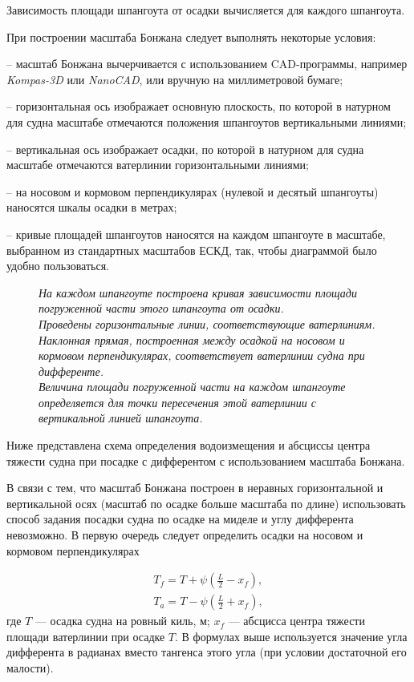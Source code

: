 Зависимость площади шпангоута от осадки вычисляется для каждого шпангоута.

При построении масштаба Бонжана следует выполнять некоторые условия:

-- масштаб Бонжана вычерчивается с использованием CAD-программы, например \textit{Kompas-3D} или \textit{NanoCAD}, или вручную на миллиметровой бумаге;

-- горизонтальная ось изображает основную плоскость, по которой в натурном для судна масштабе отмечаются положения шпангоутов вертикальными линиями;

-- вертикальная ось изображает осадки, по которой в натурном для судна масштабе отмечаются ватерлинии горизонтальными линиями;

-- на носовом и кормовом перпендикулярах (нулевой и десятый шпангоуты) наносятся шкалы осадки в метрах;

-- кривые площадей шпангоутов наносятся на каждом шпангоуте в масштабе, выбранном из стандартных масштабов ЕСКД, так, чтобы диаграммой было удобно пользоваться.

\begin{figure}[h!]
    \centerline{}
    \caption{Пример масштаба Бонжана}
    \caption*{\textit{
        На каждом шпангоуте построена кривая зависимости площади погруженной части этого шпангоута от осадки. \\
        Проведены горизонтальные линии, соответствующие ватерлиниям.\\
        Наклонная прямая, построенная между осадкой на носовом и кормовом перпендикулярах, соответствует ватерлинии судна при дифференте. \\
        Величина площади погруженной части на каждом шпангоуте определяется для точки пересечения этой ватерлинии с вертикальной линией шпангоута.
    }}
    \label{fig:bonjean-diagram}
\end{figure}


Ниже представлена схема определения водоизмещения и абсциссы центра тяжести судна при посадке с дифферентом с использованием масштаба Бонжана.

В связи с тем, что масштаб Бонжана построен в неравных горизонтальной и вертикальной осях (масштаб по осадке больше масштаба по длине) использовать способ задания посадки судна по осадке на миделе и углу дифферента невозможно.
В первую очередь следует определить осадки на носовом и кормовом перпендикулярах

\begin{equation}
    \begin{split}
    T_f = T + \psi (\frac{L}{2} - x_f), \\
    T_a = T - \psi (\frac{L}{2} + x_f),
    \end{split}
\end{equation}
где $T$ --- осадка судна на ровный киль, м;
$x_f$ --- абсцисса центра тяжести площади ватерлинии при осадке $T$.
В формулах выше используется значение угла дифферента в радианах вместо тангенса этого угла (при условии достаточной его малости).

